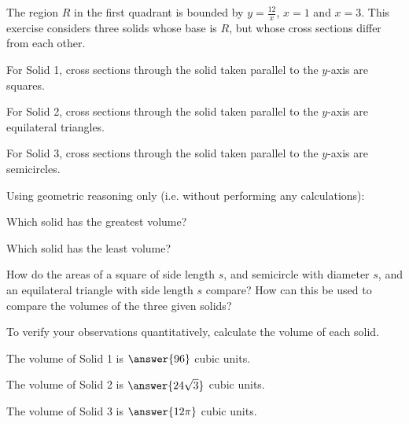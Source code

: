 \documentclass{ximera}
\author{Jim Talamo}
\begin{document}
\begin{exercise}


The region $R$ in the first quadrant is bounded by $y=\frac{12}{x}$, $x=1$ and $x=3$.  This exercise considers three solids whose base is $R$, but whose cross sections differ from each other. 





For Solid 1, cross sections through the solid taken parallel to the $y$-axis are squares.

For Solid 2, cross sections through the solid taken parallel to the $y$-axis are equilateral triangles.

For Solid 3, cross sections through the solid taken parallel to the $y$-axis are semicircles.

\begin{exercise}
Using geometric reasoning only (i.e. without performing any calculations):

Which solid has the greatest volume?
\begin{multipleChoice}
\end{multipleChoice}

Which solid has the least volume?
\begin{multipleChoice}
\end{multipleChoice}

\begin{hint}
How do the areas of a square of side length $s$, and semicircle with diameter $s$, and an equilateral triangle with side length $s$ compare?  How can this be used to compare the volumes of the three given solids?
\end{hint}

\end{exercise}

\begin{exercise}
To verify your observations quantitatively, calculate the volume of each solid.

The volume of Solid 1 is $\answer{96}$ cubic units.
	
The volume of Solid 2 is $\answer{24 \sqrt{3}}$ cubic units.

The volume of Solid 3 is $\answer{12 \pi }$ cubic units.

\end{exercise}


\end{exercise}
\end{document}
